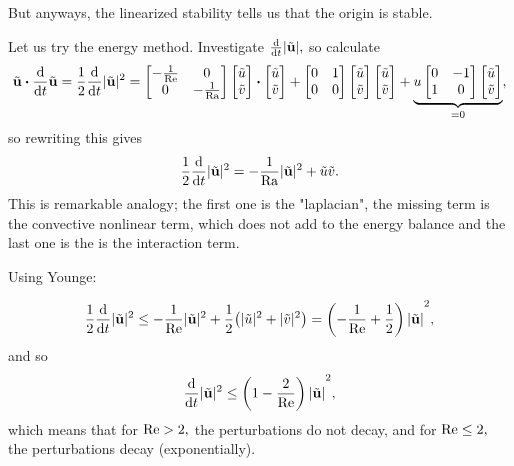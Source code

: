 \documentclass[../main.tex]{subfiles}
\begin{document}
But anyways, the linearized stability tells us that the origin is stable.

Let us try the energy method. Investigate $\dv{t} |\tilde{\vb{u}}|, $ so calculate
\[
	\tilde{\vb{u}} \vdot \dv{t} \tilde{\vb{u}} = \frac{1}{2} \dv{t} |\tilde{\vb{u}}|^{2} = \begin{bmatrix}
		- \frac{1}{\Reynolds} & 0 \\
		0 & - \frac{1}{\Rayleigh}
	\end{bmatrix}
	\begin{bmatrix}
		\tilde{u} \\
		\tilde{v}
	\end{bmatrix}
	\vdot \begin{bmatrix}
		\tilde{u}\\
		\tilde{v}
	\end{bmatrix}
	+ \begin{bmatrix}
		0 & 1 \\
		0 & 0
	\end{bmatrix}
	\begin{bmatrix}
		\tilde{u} \\
		\tilde{v}
	\end{bmatrix}
	\begin{bmatrix}
		\tilde{u} \\
		\tilde{v}
	\end{bmatrix} + \underbrace{u\begin{bmatrix}
	0 & -1 \\
	1 & 0
	\end{bmatrix}
	\begin{bmatrix}
	  \tilde{u} \\
	  \tilde{v}
\end{bmatrix}}_{= 0},
\]
so rewriting this gives
\[
	\frac{1}{2}\dv{t} |\tilde{\vb{u}}|^{2} = - \frac{1}{\mathrm{Ra}}|\tilde{\vb{u}}|^{2}+ \tilde{u} \tilde{v}.
\]
This is remarkable analogy; the first one is the "laplacian", the missing term is the convective nonlinear term, which does not add to the energy balance and the last one is the is the interaction term.

Using Younge:

\[
	\frac{1}{2}\dv{t} |\tilde{\vb{u}}|^{2} \leq - \frac{1}{\mathrm{Re}}|\tilde{\vb{u}}|^{2} + \frac{1}{2}\qty(|\tilde{u}|^{2} + |\tilde{v}|^{2}) = \qty(- \frac{1}{\mathrm{Re}}+ \frac{1}{2})|\tilde{\vb{u}}|^{2},
\]
and so
\[
	\dv{t} |\tilde{\vb{u}}|^{2} \leq \qty(1-\frac{2}{\mathrm{Re}})|\tilde{\vb{u}}|^{2},
\]
which means that for $\mathrm{Re} > 2, $ the perturbations do not decay, and for $\mathrm{Re} \leq 2, $ the perturbations decay (exponentially). 
\end{document}
